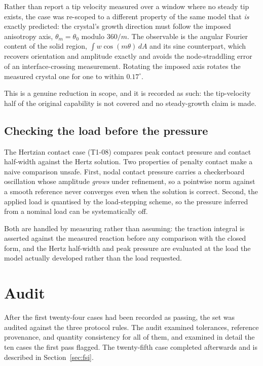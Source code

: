 \documentclass[11pt,a4paper]{article}
\begin{document}
Rather than report a tip velocity measured over a window where no steady tip
exists, the case was re-scoped to a different property of the same model that
\emph{is} exactly predicted: the crystal's growth direction must follow the
imposed anisotropy axis, $\theta_m = \theta_0$ modulo $360/m$. The observable is
the angular Fourier content of the solid region, $\int w\cos(m\theta)\,dA$ and its
sine counterpart, which recovers orientation and amplitude exactly and avoids the
node-straddling error of an interface-crossing measurement. Rotating the imposed
axis rotates the measured crystal one for one to within $0.17^{\circ}$.

This is a genuine reduction in scope, and it is recorded as such: the
tip-velocity half of the original capability is not covered and no steady-growth
claim is made.

\subsection{Checking the load before the pressure}
The Hertzian contact case (T1-08) compares peak contact pressure and contact
half-width against the Hertz solution. Two properties of penalty contact make a
naive comparison unsafe. First, nodal contact pressure carries a checkerboard
oscillation whose amplitude \emph{grows} under refinement, so a pointwise norm
against a smooth reference never converges even when the solution is correct.
Second, the applied load is quantised by the load-stepping scheme, so the
pressure inferred from a nominal load can be systematically off.

Both are handled by measuring rather than assuming: the traction integral is
asserted against the measured reaction before any comparison with the closed
form, and the Hertz half-width and peak pressure are evaluated at the load the
model actually developed rather than the load requested.

\section{Audit}
\label{sec:audit}

After the first twenty-four cases had been recorded as passing, the set was
audited against the three protocol rules. The audit examined tolerances,
reference provenance, and quantity consistency for all of them, and examined in
detail the ten cases the first pass flagged. The twenty-fifth case completed
afterwards and is described in Section~\ref{sec:fsi}.
\end{document}
